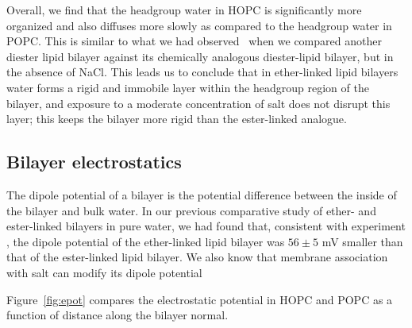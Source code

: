 \documentclass[12pt,preprint,times,openany,draft]{book}
\begin{document}
Overall, we find that the headgroup water in HOPC is significantly more organized and also diffuses more slowly as compared 
to the headgroup water in POPC. This is similar to what we had 
observed~\cite{kruczek:2017:ether} when we compared another diester lipid 
bilayer against its chemically analogous diester-lipid bilayer, but in the absence of NaCl. 
This leads us to conclude that in ether-linked lipid bilayers water forms a rigid and immobile layer within the headgroup region of the bilayer,
and exposure to a moderate concentration of salt does not disrupt this layer; this keeps the bilayer more rigid than the ester-linked analogue.

\subsection{Bilayer electrostatics}

The dipole potential of a bilayer is the potential difference between the inside of the bilayer 
and bulk water. In our previous comparative study of ether- and ester-linked bilayers in pure water, \cite{kruczek:2017:ether} 
we had found that, consistent with experiment \cite{gawrisch:1992}, 
the dipole potential of the ether-linked lipid bilayer was $56 \pm 5$ mV smaller 
than that of the ester-linked lipid bilayer. We also know that membrane association with salt can modify its dipole potential

Figure~\ref{fig:epot} compares the electrostatic potential in HOPC and POPC 
as a function of distance along the bilayer normal. 
\end{document}
